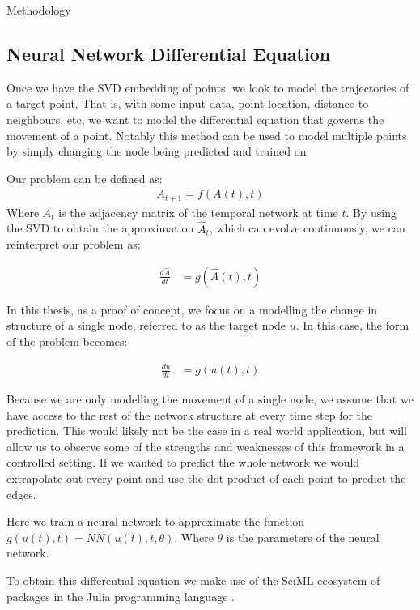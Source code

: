 \documentclass[12pt]{amsart}
\begin{document}
\begin{section}{Methodology}
    \subsection{Neural Network Differential Equation}
        Once we have the SVD embedding of points, we look to model the trajectories of a target point. That is, with some input data, point location, distance to neighbours, etc, we want to model the differential equation that governs the movement of a point. Notably this method can be used to model multiple points by simply changing the node being predicted and trained on. 
            
        Our problem can be defined as:
        \begin{align}
            A_{t+1} = f(A(t),t)
        \end{align}
        Where $A_t$ is the adjacency matrix of the temporal network at time $t$. By using the SVD to obtain the approximation $\hat A_t$, which can evolve continuously, we can reinterpret our problem as:

        \begin{align}
            \frac{d\hat A}{dt} &= g(\hat A(t), t)
        \end{align}

        In this thesis, as a proof of concept, we focus on a modelling the change in structure of a single node, referred to as the target node $u$. In this case, the form of the problem becomes:

        \begin{align}
            \frac{du}{dt} &= g(u(t), t)
        \end{align}

        Because we are only modelling the movement of a single node, we assume that we have access to the rest of the network structure at every time step for the prediction. This would likely not be the case in a real world application, but will allow us to observe some of the strengths and weaknesses of this framework in a controlled setting. If we wanted to predict the whole network we would extrapolate out every point and use the dot product of each point to predict the edges.
        
        Here we train a neural network to approximate the function $g(u(t),t)=NN(u(t),t,\theta)$. Where $\theta$ is the parameters of the neural network.

        
        To obtain this differential equation we make use of the SciML ecosystem of packages in the Julia programming language \cite{SciML_C_Rak}.    
        

\end{section}
\end{document}
